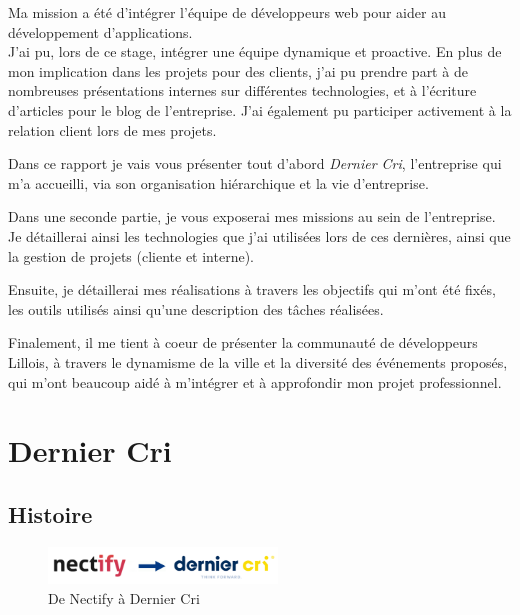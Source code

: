 \bigskip

Ma mission a été d'intégrer l'équipe de développeurs web pour aider au
développement d'applications.\\
J'ai pu, lors de ce stage, intégrer une équipe dynamique et proactive.
En plus de mon implication dans les projets pour des clients, j'ai pu
prendre part à de nombreuses présentations internes sur différentes
technologies, et à l'écriture d'articles pour le blog de l'entreprise.
J'ai également pu participer activement à la relation client lors de mes
projets.

\bigskip

Dans ce rapport je vais vous présenter tout d'abord \emph{Dernier Cri},
l'entreprise qui m'a accueilli, via son organisation hiérarchique et la
vie d'entreprise.

\bigskip

Dans une seconde partie, je vous exposerai mes missions au sein de
l'entreprise. Je détaillerai ainsi les technologies que j'ai utilisées
lors de ces dernières, ainsi que la gestion de projets (cliente et
interne).

\bigskip

Ensuite, je détaillerai mes réalisations à travers les objectifs qui
m'ont été fixés, les outils utilisés ainsi qu'une description des tâches
réalisées.

\bigskip

Finalement, il me tient à coeur de présenter la communauté de
développeurs Lillois, à travers le dynamisme de la ville et la diversité
des événements proposés, qui m'ont beaucoup aidé à m'intégrer et à
approfondir mon projet professionnel.

\newpage

\section{Dernier Cri}\label{dernier-cri}

\bigskip

\subsection{Histoire}\label{histoire}

\begin{figure}[h]
  \centering
  \includegraphics[height=1cm]{figures/NectifyToDC.png}
  \caption{De Nectify à Dernier Cri}
\end{figure}

